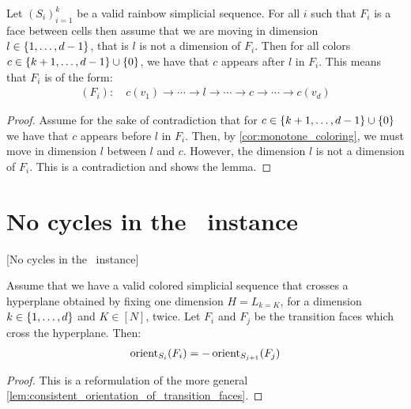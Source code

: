 \begin{lemma}
	\label{lem:ordering_of_vertices_in_transition_faces}
	Let $\left(S_i\right)_{i=1}^k$ be a valid rainbow simplicial sequence. For all $i$ such that $F_i$ is a face between cells then assume that we are moving in dimension $l \in \left\{1, \dots, d-1\right\}$, that is $l$ is not a dimension of $F_i$. Then for all colors $c \in \left\{k+1, \dots, d-1\right\} \cup \left\{0\right\}$, we have that $c$ appears after $l$ in $F_i$. This means that $F_i$ is of the form:
	\begin{align*}
		(F_i): \quad c(v_1) \xrightarrow{} \cdots \xrightarrow{} l \xrightarrow{} \cdots \xrightarrow{} c \xrightarrow{} \cdots \xrightarrow{} c(v_d)
	\end{align*}
\end{lemma}
\begin{proof}
	Assume for the sake of contradiction that for $c \in \left\{k+1, \dots, d-1\right\} \cup \left\{0\right\}$ we have that $c$ appears before $l$ in $F_i$. Then, by \cref{cor:monotone_coloring}, we must move in dimension $l$ between $l$ and $c$. However, the dimension $l$ is not a dimension of $F_i$. This is a contradiction and shows the lemma.
\end{proof}

\section{No cycles in the \EndOfLine\ instance}[No cycles in the \EndOfLine\ instance]

\begin{remark}
	Assume that we have a valid colored simplicial sequence that crosses a hyperplane obtained by fixing one dimension $H = L_{k = K}$, for a dimension $k \in \left\{1, \dots, d\right\}$ and $K \in [N]$, twice. Let $F_i$ and $F_j$ be the transition faces which cross the hyperplane. Then: 
	\begin{align*}
		\operatorname{orient}_{S_i}(F_i) = - \operatorname{orient}_{S_{j+1}}(F_j)
	\end{align*}
\end{remark}
\begin{proof}
	This is a reformulation of the more general \cref{lem:consistent_orientation_of_transition_faces}.
\end{proof}

